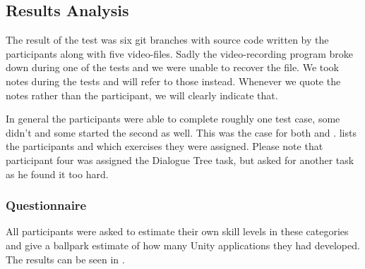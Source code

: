 \subsection{Results Analysis} \label{sec:test-results}
The result of the test was six git branches with source code written by the participants along with five video-files. Sadly the video-recording program broke down during one of the tests and we were unable to recover the file. We took notes during the tests and will refer to those instead. Whenever we quote the notes rather than the participant, we will clearly indicate that.

In general the participants were able to complete roughly one test case, some didn't and some started the second as well. This was the case for both \fsh and \csh.  lists the participants and which exercises they were assigned. Please note that participant four was assigned the Dialogue Tree task, but asked for another task as he found it too hard.


\subsubsection{Questionnaire}
All participants were asked to estimate their own skill levels in these categories and give a ballpark estimate of how many Unity applications they had developed. The results can be seen in .


\newcommand{\mn}{\newmoon}
\newcommand{\mns}{\fullmoon}

